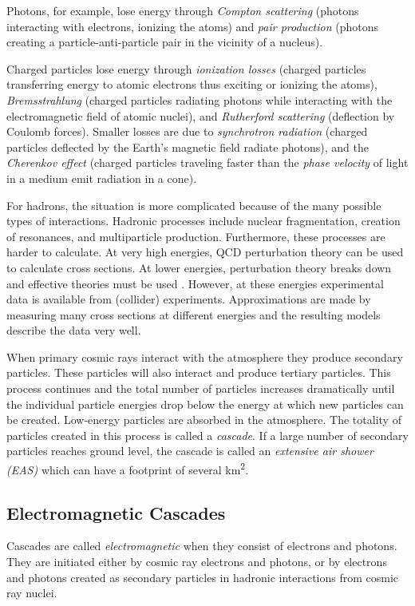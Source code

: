Photons, for example, lose energy through \emph{Compton scattering} (photons
interacting with electrons, ionizing the atoms) and \emph{pair production}
(photons creating a particle-anti-particle pair in the vicinity of a nucleus).

Charged particles lose energy through \emph{ionization losses} (charged
particles transferring energy to atomic electrons thus exciting or ionizing the
atoms), \emph{Bremsstrahlung} (charged particles radiating photons while
interacting with the electromagnetic field of atomic nuclei), and
\emph{Rutherford scattering} (deflection by Coulomb forces).  Smaller losses are
due to \emph{synchrotron radiation} (charged particles deflected by the
Earth's magnetic field radiate photons), and the \emph{Cherenkov effect}
(charged particles traveling faster than the \emph{phase velocity} of light in a
medium emit radiation in a cone).

For hadrons, the situation is more complicated because of the many possible types of
interactions. Hadronic processes include nuclear fragmentation, creation of
resonances, and multiparticle production.
Furthermore, these processes are harder to calculate.  At very high energies,
QCD perturbation theory can be used to calculate cross sections.  At lower
energies, perturbation theory breaks down and effective theories must be used
\cite{Pythia:1987}. However, at these energies experimental data is available
from (collider) experiments. Approximations are made by measuring many cross
sections at different energies and the resulting models describe the data very
well.

When primary cosmic rays interact with the atmosphere they produce secondary
particles.  These particles will also interact and produce tertiary particles.
This process continues and the total number of particles increases dramatically
until the individual particle energies drop below the energy at which new
particles can be created.  Low-energy particles are absorbed in the
atmosphere.  The totality of particles created in this process is called a
\emph{cascade}.  If a large number of secondary particles reaches ground
level, the cascade is called an \emph{extensive air shower (EAS)} which
can have a footprint of several \si{\kilo\meter\squared}.


\subsection{Electromagnetic Cascades}

Cascades are called \emph{electromagnetic} when they consist of electrons and
photons.  They are initiated either by cosmic ray electrons and photons, or by
electrons and photons created as secondary particles in hadronic interactions
from cosmic ray nuclei.

